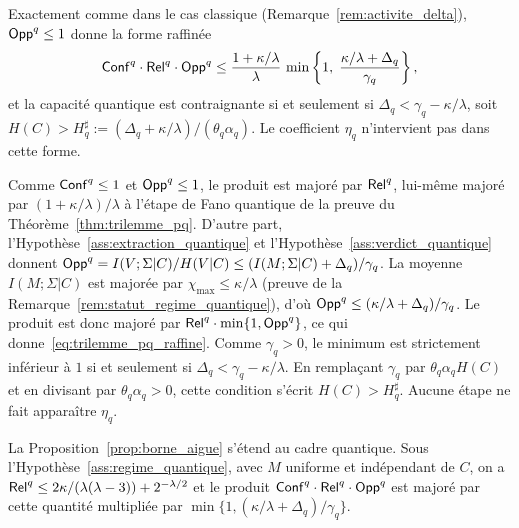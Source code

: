 \begin{sloppypar}
\begin{remark}\label{rem:forme_raffinee_pq}
Exactement comme dans le cas classique (Remarque~\ref{rem:activite_delta}),
$\mathsf{Opp}^q \leq 1$ donne la forme raffin\'ee
\begin{equation}
\mathsf{Conf}^q \cdot \mathsf{Rel}^q \cdot \mathsf{Opp}^q \leq \frac{1+\kappa/\lambda}{\lambda}\,
\min\left\{1,\; \frac{\kappa/\lambda + \Delta_q}{\gamma_q}\right\},
\label{eq:trilemme_pq_raffine}
\end{equation}
et la capacit\'e quantique est contraignante si et seulement si
$\Delta_q < \gamma_q - \kappa/\lambda$, soit
$H(C) > H^\sharp_q := (\Delta_q + \kappa/\lambda)/(\theta_q\alpha_q)$. Le
coefficient $\eta_q$ n'intervient pas dans cette forme.
\end{remark}

\begin{Preuve}
Comme $\mathsf{Conf}^q \leq 1$ et $\mathsf{Opp}^q \leq 1$, le produit est major\'e par $\mathsf{Rel}^q$,
lui-m\^eme major\'e par $(1+\kappa/\lambda)/\lambda$ \`a l'\'etape de Fano quantique de
la preuve du Th\'eor\`eme~\ref{thm:trilemme_pq}. D'autre part,
l'Hypoth\`ese~\ref{ass:extraction_quantique} et
l'Hypoth\`ese~\ref{ass:verdict_quantique} donnent
$\mathsf{Opp}^q = I(V;\Sigma|C)/H(V|C) \leq (I(M;\Sigma|C) + \Delta_q)/\gamma_q$. La
moyenne $I(M;\Sigma|C)$ est major\'ee par $\chi_{\max} \leq \kappa/\lambda$
(preuve de la Remarque~\ref{rem:statut_regime_quantique}), d'o\`u
$\mathsf{Opp}^q \leq (\kappa/\lambda + \Delta_q)/\gamma_q$. Le produit est donc major\'e par
$\mathsf{Rel}^q \cdot \min\{1, \mathsf{Opp}^q\}$, ce qui donne~\eqref{eq:trilemme_pq_raffine}.
Comme $\gamma_q > 0$, le minimum est strictement inf\'erieur \`a $1$ si et
seulement si $\Delta_q < \gamma_q - \kappa/\lambda$. En rempla\c{c}ant $\gamma_q$ par
$\theta_q\alpha_q H(C)$ et en divisant par $\theta_q\alpha_q > 0$, cette condition
s'\'ecrit $H(C) > H^\sharp_q$. Aucune \'etape ne fait appara\^itre $\eta_q$.
\end{Preuve}

\begin{remark}
\label{rem:borne_aigue_pq}
La Proposition~\ref{prop:borne_aigue} s'\'etend au cadre quantique. Sous
l'Hypoth\`ese~\ref{ass:regime_quantique}, avec $M$ uniforme et ind\'ependant de $C$, on a
$\mathsf{Rel}^q \leq 2\kappa/(\lambda(\lambda-3)) + 2^{-\lambda/2}$ et le produit
$\mathsf{Conf}^q \cdot \mathsf{Rel}^q \cdot \mathsf{Opp}^q$ est major\'e par cette quantit\'e multipli\'ee par
$\min\{1,(\kappa/\lambda+\Delta_q)/\gamma_q\}$.
\end{remark}


\end{sloppypar}
